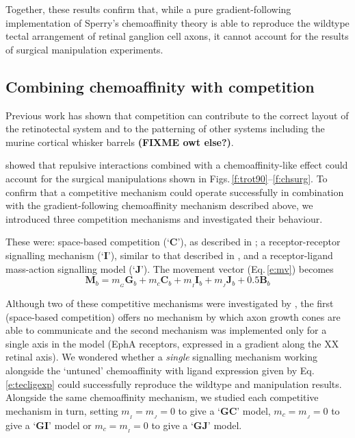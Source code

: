 \documentclass[11pt, a4paper]{article}
\begin{document}
Together, these results confirm that, while a pure gradient-following
implementation of Sperry's chemoaffinity theory is able to reproduce the
wildtype tectal arrangement of retinal ganglion cell axons, it cannot account
for the results of surgical manipulation experiments.

\subsection*{Combining chemoaffinity with competition}

Previous work has shown that competition can contribute to the correct layout
of the retinotectal system \citep{stuff} and to the patterning of other
systems including the murine cortical whisker
barrels \citep{james_modelling_2020} \textbf{(FIXME owt else?)}.

\citet{simpson_simple_2011} showed that repulsive interactions combined with a
chemoaffinity-like effect could account for the surgical manipulations shown
in Figs.\,\ref{f:trot90}--\ref{f:chsurg}. To confirm that a competitive
mechanism could operate successfully in combination with the
gradient-following chemoaffinity mechanism described above, we introduced
three competition mechanisms and investigated their behaviour.

These were: space-based competition (`$\mathbf{C}$'), as described
in \citet{simpson_simple_2011}; a receptor-receptor signalling mechanism
(`$\mathbf{I}$'), similar to that described in \citet{simpson_simple_2011},
and a receptor-ligand mass-action signalling model
(`$\mathbf{J}$'). The movement vector (Eq.\,\ref{e:mv}) becomes
%
\begin{equation} \label{e:mv2}
\mathbf{M}_{b} = m_{\!_G} \mathbf{G}_b +  m_c \mathbf{C}_b +  m_{\!_I} \mathbf{I}_b +  m_{\!_J} \mathbf{J}_b + 0.5 \mathbf{B}_b
\end{equation}
%

Although two of these competitive mechanisms were investigated
by \citet{simpson_simple_2011}, the first (space-based competition) offers no
mechanism by which axon growth cones are able to communicate and the second
mechanism was implemented only for a single axis in the model (EphA receptors,
expressed in a gradient along the XX retinal axis). We wondered whether a
\emph{single} signalling mechanism working alongside the `untuned'
chemoaffinity with ligand expression given by Eq.\,\ref{e:tecligexp} could
successfully reproduce the wildtype and manipulation results. Alongside the
same chemoaffinity mechanism, we studied each competitive mechanism in turn,
setting $m_{\!_I}=m_{\!_J}=0$ to give a `$\mathbf{GC}$' model,
$m_c=m_{\!_J}=0$ to give a `$\mathbf{GI}$' model or $m_c=m_{\!_I}=0$ to give a
`$\mathbf{GJ}$' model.
\end{document}
